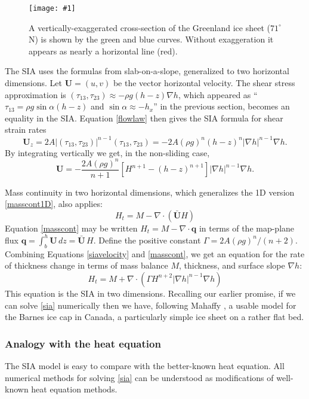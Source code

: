 \documentclass[letterpaper,final,12pt,reqno]{amsart}
\newcommand{\bq}{\mathbf{q}}
\newcommand{\grad}{\nabla}
\newcommand{\Div}{\nabla\cdot}
\newcommand{\onefigsize}[3]{
\begin{figure}[ht]
\centering
\texttt{[image: \#1]}
\caption{#2}
\label{fig:#1}
\end{figure}}
\newcommand{\onefig}[2]{\onefigsize{#1}{#2}{3.0in}}
\begin{document}
\onefig{green_transect}{A vertically-exaggerated cross-section of the Greenland ice sheet ($71^\circ$ N) is shown by the green and blue curves.  Without exaggeration it appears as nearly a horizontal line (red).}

The SIA uses the formulas from slab-on-a-slope, generalized to two horizontal dimensions.  Let $\mathbf{U} = (u,v)$ be the vector horizontal velocity.  The shear stress approximation is $(\tau_{13},\tau_{23}) \approx - \rho g (h-z) \nabla h$, which appeared as ``$\tau_{13}= \rho g \sin \alpha (h-z)$ and $\sin \alpha \approx -h_x$'' in the previous section, becomes an equality in the SIA.  Equation \eqref{flowlaw} then gives the SIA formula for shear strain rates
\begin{equation*}
\mathbf{U}_z = 2 A |(\tau_{13},\tau_{23})|^{n-1} (\tau_{13},\tau_{23}) = - 2 A (\rho g)^n (h-z)^n |\nabla h|^{n-1} \nabla h.
\end{equation*}
By integrating vertically we get, in the non-sliding case,
\begin{equation}
\mathbf{U} = - \frac{2 A (\rho g)^n}{n+1} \left[H^{n+1} - (h-z)^{n+1}\right] |\nabla h|^{n-1} \nabla h.  \label{siavelocity}
\end{equation}

Mass continuity in two horizontal dimensions, which generalizes the 1D version \eqref{masscont1D}, also applies:
\begin{equation}
    H_t = M - \Div\left(\bar{\mathbf{U}} H\right)  \label{masscont}
\end{equation}
Equation \eqref{masscont} may be written $H_t = M - \Div \bq$ in terms of the map-plane flux $\bq = \int_{b}^{h} \mathbf{U}\,dz = \bar{\mathbf{U}}\,H$.  Define the positive constant $\Gamma = 2 A (\rho g)^n / (n+2)$.  Combining Equations \eqref{siavelocity} and \eqref{masscont}, we get an equation for the rate of thickness change in terms of mass balance $M$, thickness, and surface slope $\grad h$:
\begin{equation}
H_t = M + \Div \left(\Gamma H^{n+2} |\grad h|^{n-1} \grad h \right) \label{sia}
\end{equation}
This equation is the SIA in two dimensions.  Recalling our earlier promise, if we can solve \eqref{sia} numerically then we have, following Mahaffy \cite{Mahaffy}, a usable model for the Barnes ice cap in Canada, a particularly simple ice sheet on a rather flat bed.

\subsubsection*{Analogy with the heat equation}  The SIA model is easy to compare with the better-known heat equation.  All numerical methods for solving \eqref{sia} can be understood as modifications of well-known heat equation methods.
\end{document}
